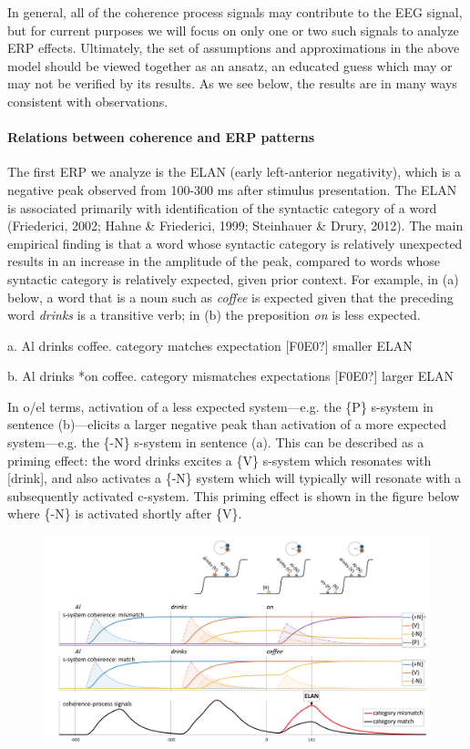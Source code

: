 In general, all of the coherence process signals may contribute to the EEG signal, but for current purposes we will focus on only one or two such signals to analyze ERP effects. Ultimately, the set of assumptions and approximations in the above model should be viewed together as an ansatz, an educated guess which may or may not be verified by its results. As we see below, the results are in many ways consistent with observations.

\paragraph{Relations between coherence and ERP patterns}

The first ERP we analyze is the ELAN (early left-anterior negativity), which is a negative peak observed from 100-300 ms after stimulus presentation. The ELAN is associated primarily with identification of the syntactic category of a word (Friederici, 2002; Hahne \& Friederici, 1999; Steinhauer \& Drury, 2012). The main empirical finding is that a word whose syntactic category is relatively unexpected results in an increase in the amplitude of the peak, compared to words whose syntactic category is relatively expected, given prior context. For example, in (a) below, a word that is a noun such as \textit{coffee} is expected given that the preceding word \textit{drinks} is a transitive verb; in (b) the preposition \textit{on} is less expected.

a. Al drinks coffee.         category matches expectation [F0E0?] smaller ELAN

b. Al drinks *on coffee.    category mismatches expectations [F0E0?] larger ELAN

In o/el terms, activation of a less expected system—e.g. the \{P\} s-system in sentence (b)—elicits a larger negative peak than activation of a more expected system—e.g. the \{-N\} s-system in sentence (a). This can be described as a priming effect: the word drinks excites a \{V\} s-system which resonates with [drink], and also activates a \{-N\} system which will typically will resonate with a subsequently activated c-system. This priming effect is shown in the figure below where \{-N\} is activated shortly after \{V\}. 

  
\begin{figure}
\includegraphics[width=\textwidth]{figures/Tilsen-img142.png}
\caption{\missingcaption}
\label{fig:}
\end{figure}
 

